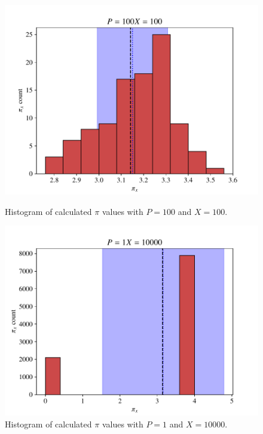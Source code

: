\begin{figure}[h!]
	\centering
	\begin{minipage}{0.45\linewidth}
		\centering
		\includegraphics[width=\linewidth]{figs/ex1.2_pi_hist_100_100.pdf}
		\caption{Histogram of calculated $\pi$ values with $P = 100$ and
			$X = 100$.}
		\label{fig:pi_hist_100_100}
	\end{minipage}
    \hfill
    \begin{minipage}{.45\linewidth}
       \centering
       \includegraphics[width=\linewidth]{figs/ex1.2_pi_hist_1_10000.pdf} 
		\caption{Histogram of calculated $\pi$ values with $P = 1$ and
			$X = \num{10000}$.}
		\label{fig:pi_hist_1_10000}
    \end{minipage}
\end{figure}







